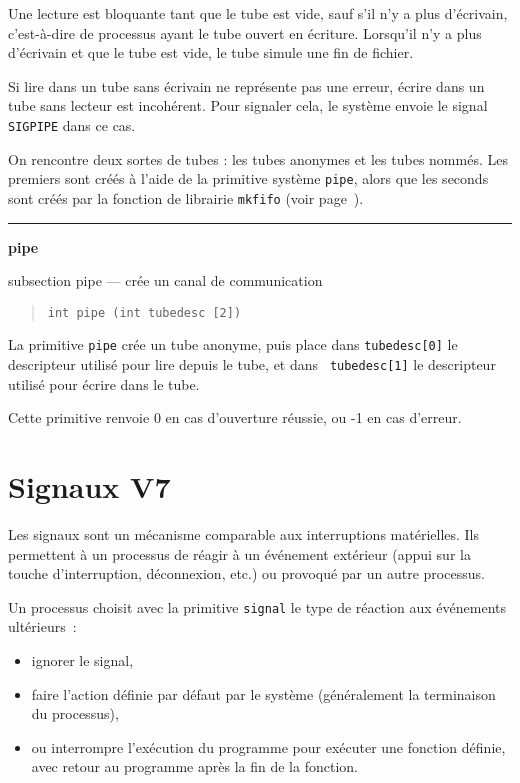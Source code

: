 \documentclass [twoside] {report}
\newcommand {\primitive} [1]
    {
	{\large \bf #1}
	\addcontentsline {toc} {subsection} {#1}
    }
\newcommand {\separation}
    {
	\vspace {7mm}
	\nopagebreak
	\hrule
    }
\begin{document}
Une lecture est bloquante tant que le tube est vide, sauf s'il n'y a
plus d'écrivain, c'est-à-dire de processus ayant le tube ouvert en
écriture. Lorsqu'il n'y a plus d'écrivain et que le tube est vide,
le tube simule une fin de fichier.

Si lire dans un tube sans écrivain ne représente pas une erreur,
écrire dans un tube sans lecteur est incohérent. Pour signaler
cela, le système envoie le signal {\tt SIGPIPE} dans ce cas.

On rencontre deux sortes de tubes : les tubes anonymes et
les tubes nommés. Les premiers sont créés à l'aide de la
primitive système {\tt pipe}, alors que les seconds sont créés par
la fonction de librairie {\tt mkfifo} (voir page~\pageref {mkfifo}).


\separation
\primitive {pipe} --- crée un canal de communication

\begin {quote}
\begin {verbatim}
int pipe (int tubedesc [2])
\end{verbatim}
\end {quote}

La primitive {\tt pipe} crée un tube anonyme,
puis place dans {\tt tubedesc[0]}
le descripteur utilisé pour lire depuis le tube, et dans {\tt
tubedesc[1]} le descripteur utilisé pour écrire dans le tube.

Cette primitive renvoie 0 en cas d'ouverture
réussie, ou -1 en cas d'erreur.






\section {Signaux V7}


Les signaux sont un mécanisme comparable aux interruptions
matérielles. Ils permettent à un processus de réagir à un
événement extérieur (appui sur la touche d'interruption,
déconnexion, etc.) ou provoqué par un autre processus.

Un processus choisit avec la primitive {\tt signal}
le type de réaction aux événements ultérieurs~:

\begin {itemize}
    \item ignorer le signal,
    \item faire l'action définie par défaut par le
	système (généralement la terminaison du processus),
    \item ou interrompre l'exécution du programme pour exécuter
	une fonction définie, avec retour au programme après
	la fin de la fonction.
\end {itemize}
\end{document}
